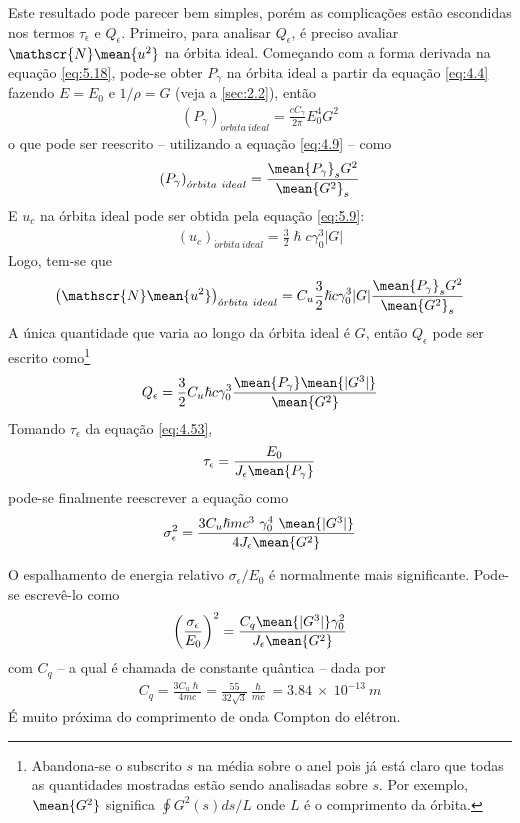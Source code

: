 Este resultado pode parecer bem simples, porém as complicações estão escondidas nos termos $\tau_\epsilon$ e $Q_\epsilon$. Primeiro, para analisar $Q_\epsilon$, é preciso avaliar $\mathscr{N}\mean{u^2}$ na órbita ideal. Começando com a forma derivada na equação \eqref{eq:5.18}, pode-se obter $P_\gamma$ na órbita ideal a partir da equação \eqref{eq:4.4} fazendo $E=E_0$ e $1/\rho = G$ (veja a \autoref{sec:2.2}), então
\begin{align}
	\left(P_\gamma\right)_{\acute{o}rbita\ ideal} = \frac{c C_\gamma}{2\pi}E_0^4G^2
\end{align}
o que pode ser reescrito -- utilizando a equação \eqref{eq:4.9} -- como
\begin{align}
	\left(P_\gamma\right)_{\acute{o}rbita\ ideal} = \frac{\mean{P_\gamma}_s G^2}{\mean{G^2}_s}
\end{align}
E $u_c$ na órbita ideal pode ser obtida pela equação \eqref{eq:5.9}:
\begin{align}
	\left(u_c\right)_{\acute{o}rbita\ ideal} = \frac{3}{2}\hslash c \gamma_0^3 |G|
\end{align}
Logo, tem-se que
\begin{align}
	\left(\mathscr{N}\mean{u^2}\right)_{\acute{o}rbita\ ideal} = C_u \frac{3}{2}\hslash c \gamma_0^3 |G| \frac{\mean{P_\gamma}_s G^2}{\mean{G^2}_s}
\end{align}
A única quantidade que varia ao longo da órbita ideal é $G$, então $Q_\epsilon$ pode ser escrito como\footnote{Abandona-se o subscrito $s$ na média sobre o anel pois já está claro que todas as quantidades mostradas estão sendo analisadas sobre $s$. Por exemplo, $\mean{G^2}$ significa $\oint G^2(s)ds/ L$ onde $L$ é o comprimento da órbita.}
\begin{align}
	Q_\epsilon = \frac{3}{2}C_u\hslash c \gamma_0^3 \frac{\mean{P_\gamma} \mean{|G^3|}}{\mean{G^2}}
\end{align}
Tomando $\tau_\epsilon$ da equação \eqref{eq:4.53},
\begin{align}
	\tau_\epsilon = \frac{E_0}{J_\epsilon\mean{P_\gamma}}
\end{align}
pode-se finalmente reescrever a equação como
\begin{align}
	\sigma_\epsilon^2 = \frac{3 C_u \hslash m c^3\ \gamma_0^4\ \mean{|G^3|}}{4 J_\epsilon \mean{G^2}}
\end{align}

O espalhamento de energia relativo $\sigma_\epsilon/E_0$ é normalmente mais significante. Pode-se escrevê-lo como
\begin{align}
	\left(\frac{\sigma_\epsilon}{E_0}\right)^2 = \frac{C_q \mean{|G^3|} \gamma_0^2}{J_\epsilon \mean{G^2}}\label{eq:5.45}
\end{align}
com $C_q$ -- a qual é chamada de constante quântica -- dada por
\begin{align}
	C_q = \frac{3C_u\hslash}{4mc} = \frac{55}{32\sqrt{3}}\frac{\hslash}{mc} = 3.84\ \times\ 10^{-13}\ m
\end{align}
É muito próxima do comprimento de onda Compton do elétron.

